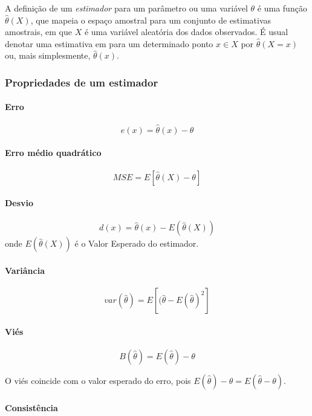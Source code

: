 \documentclass[a4paper]{article}
\let\oldparagraph\paragraph
\renewcommand{\paragraph}[1]{\oldparagraph{#1}\mbox{}}
\begin{document}
A definição de um \emph{estimador} para um parâmetro ou uma variável
\(\theta\) é uma função \(\hat{\theta}(X)\), que mapeia o espaço
amostral para um conjunto de estimativas amostrais, em que \(X\) é uma
variável aleatória dos dados observados. É usual denotar uma estimativa
em para um determinado ponto \(x \in X\) por \(\hat{\theta}(X = x)\) ou,
mais simplesmente, \(\hat{\theta}(x)\).

\subsubsection{Propriedades de um
estimador}\label{propriedades-de-um-estimador}

\paragraph{Erro}\label{erro}

\[e(x) = \hat{\theta}(x) - \theta\]

\paragraph{Erro médio quadrático}\label{erro-medio-quadratico}

\[MSE = E[\hat{\theta}(X) - \theta]\]

\paragraph{Desvio}\label{desvio}

\[d(x) = \hat{\theta}(x) - E(\hat{\theta}(X))\] onde
\(E(\hat{\theta}(X))\) é o Valor Esperado do estimador.

\paragraph{Variância}\label{variancia}

\[var(\hat{\theta}) = E[(\hat{\theta} - E(\hat{\theta})^2]\]

\paragraph{Viés}\label{vies}

\[B(\hat{\theta}) = E(\hat{\theta}) - \theta\]

O viés coincide com o valor esperado do erro, pois
\(E(\hat{\theta}) - \theta = E(\hat{\theta}-\theta)\).

\paragraph{Consistência}\label{consistencia}
\end{document}
